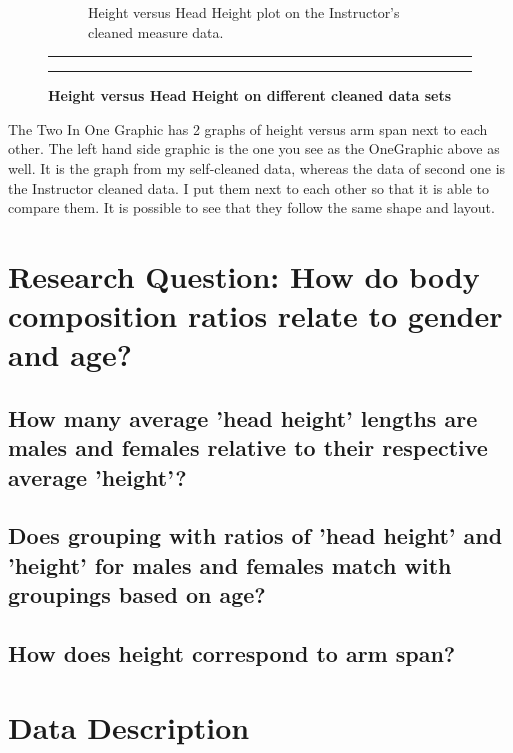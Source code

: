 \documentclass[]{article}
\begin{document}
\begin{figure}[!ht]
\begin{subfigure}[h]{0.5\textwidth}
            \caption{ Height versus Head Height plot on the Instructor's cleaned measure data.}
        \label{fig:sub-second}
    \end{subfigure}
    \vspace{2.5mm}
    \hrule
    \vspace{2.5mm}
        \caption{\textbf{ Height versus Head Height on different cleaned data sets}   }
        \label{fig:combined}
    \vspace{-2.5mm}
    \hrule
\end{figure}

The Two In One Graphic has 2 graphs of height versus arm span next to
each other. The left hand side graphic is the one you see as the
OneGraphic above as well. It is the graph from my self-cleaned data,
whereas the data of second one is the Instructor cleaned data. I put
them next to each other so that it is able to compare them. It is
possible to see that they follow the same shape and layout.

\newpage

\section{Research Question: How do body composition ratios relate to gender and age?}
\label{sec:rq}

\subsection{How many average ’head height’ lengths are males and females relative to their respective average ’height’?}
\label{sec:rq2}

\subsection{Does grouping with ratios of 'head height' and 'height' for males and females match with groupings based on age?}
\label{sec:rq3}

\subsection{How does height correspond to arm span?}
\label{sec:rq4}

\section{Data Description}
\label{sec:data}
\end{document}
